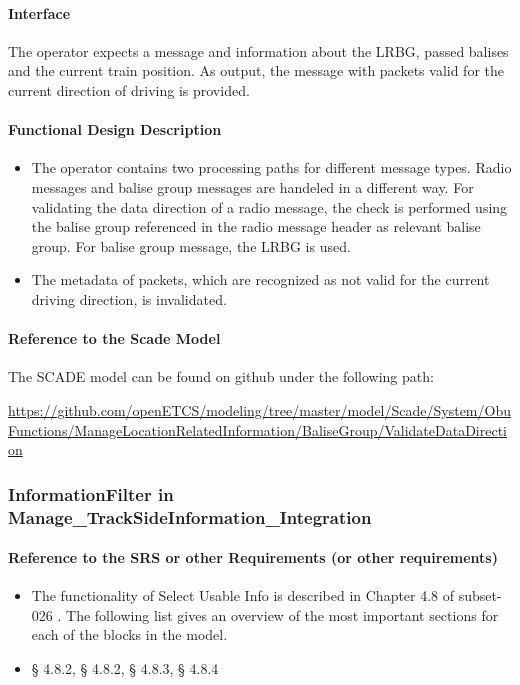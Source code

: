 \paragraph{Interface}
The operator expects a message and information about the LRBG, passed balises and the current train position. As output, the message with packets valid for the current direction of driving is provided.
\paragraph{Functional Design Description}
\begin{itemize}
 \item The operator contains two processing paths for different message types. Radio messages and balise group messages are handeled in a different way. For validating the data direction of a radio message, the check is performed using the balise group referenced in the radio message header as relevant balise group. For balise group message, the LRBG is used.
 \item The metadata of packets, which are recognized as not valid for the current driving direction, is invalidated.
\end{itemize}

\paragraph{Reference to the Scade Model}
The SCADE model can be found on github under the following path:

\tiny\url{https://github.com/openETCS/modeling/tree/master/model/Scade/System/ObuFunctions/ManageLocationRelatedInformation/BaliseGroup/ValidateDataDirection}
\normalsize

\subsubsection{InformationFilter in Manage\_TrackSideInformation\_Integration}%
\paragraph{Reference to the SRS or other Requirements (or other requirements)}
\begin{itemize}
 \item The functionality of Select Usable Info is described in Chapter 4.8 of subset-026 \cite{subset-026}. The following list gives an overview of the most important sections for each of the blocks in the model.
 \item § 4.8.2, § 4.8.2, § 4.8.3, § 4.8.4
\end{itemize}

